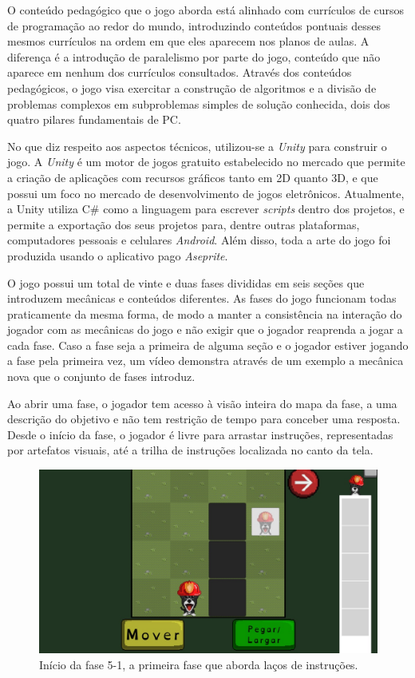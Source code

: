\documentclass[conference]{IEEEtran}
\begin{document}
O conteúdo pedagógico que o jogo aborda está alinhado com currículos de cursos de programação ao redor do mundo\cite{b8}\cite{b20}, introduzindo conteúdos pontuais desses mesmos currículos na ordem em que eles aparecem nos planos de aulas. A diferença é a introdução de paralelismo por parte do jogo, conteúdo que não aparece em nenhum dos currículos consultados. Através dos conteúdos pedagógicos, o jogo visa exercitar a construção de algoritmos e a divisão de problemas complexos em subproblemas simples de solução conhecida, dois dos quatro pilares fundamentais de PC\cite{b6}.

No que diz respeito aos aspectos técnicos, utilizou-se a \textit{Unity}\cite{b21} para construir o jogo. A \textit{Unity} é um motor de jogos gratuito estabelecido no mercado que permite a criação de aplicações com recursos gráficos tanto em 2D quanto 3D, e que possui um foco no mercado de desenvolvimento de jogos eletrônicos. Atualmente, a Unity utiliza C\#\cite{b22} como a linguagem para escrever \textit{scripts} dentro dos projetos, e permite a exportação dos seus projetos para, dentre outras plataformas, computadores pessoais e celulares \textit{Android}. Além disso, toda a arte do jogo foi produzida usando o aplicativo pago \textit{Aseprite}\cite{b23}.

O jogo possui um total de vinte e duas fases divididas em seis seções que introduzem mecânicas e conteúdos diferentes. As fases do jogo funcionam todas praticamente da mesma forma, de modo a manter a consistência na interação do jogador com as mecânicas do jogo e não exigir que o jogador reaprenda a jogar a cada fase. Caso a fase seja a primeira de alguma seção e o jogador estiver jogando a fase pela primeira vez, um vídeo demonstra através de um exemplo a mecânica nova que o conjunto de fases introduz.

Ao abrir uma fase, o jogador tem acesso à visão inteira do mapa da fase, a uma descrição do objetivo e não tem restrição de tempo para conceber uma resposta. Desde o início da fase, o jogador é livre para arrastar instruções, representadas por artefatos visuais, até a trilha de instruções localizada no canto da tela.

\begin{figure}[htbp]
\centerline{\includegraphics[scale=0.275]{images/fig01.jpg}}
\caption{Início da fase 5-1, a primeira fase que aborda laços de instruções.}
\label{fig}
\end{figure}
\end{document}
